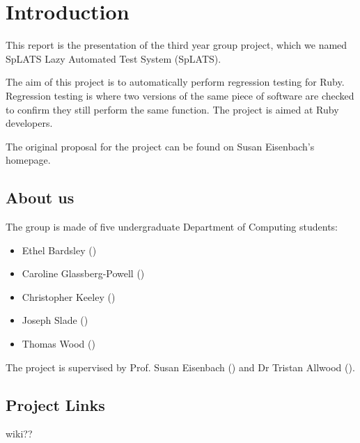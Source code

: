 \chapter{Introduction}
This report is the presentation of the third year group project, which we named SpLATS Lazy Automated Test System (SpLATS).

The aim of this project is to automatically perform regression testing for Ruby.
Regression testing is where two versions of the same piece of software are checked to confirm they still perform the same function.
The project is aimed at Ruby developers.

The original proposal for the project can be found on Susan Eisenbach's homepage.

\section{About us}
The group is made of five undergraduate Department of Computing students:
\begin{itemize}
\item{Ethel Bardsley ()}
\item{Caroline Glassberg-Powell ()}
\item{Christopher Keeley ()}
\item{Joseph Slade ()}
\item{Thomas Wood ()}
\end{itemize}

The project is supervised by Prof. Susan Eisenbach () and Dr Tristan Allwood ().

\section{Project Links}
wiki??
